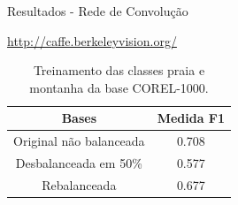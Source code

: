 \documentclass{beamer}
\begin{document}
\begin{frame}{Resultados - Rede de Convolução}
\begin{table}
\url{http://caffe.berkeleyvision.org/}
\caption{Treinamento das classes praia e montanha da base COREL-1000.}
  \begin{tabular}{c|c}
    Bases    &   Medida F1 \\ \hline
    Original não balanceada     &   0.708  \\
    Desbalanceada em 50\% &   0.577  \\
    Rebalanceada  &   0.677  \\
  \end{tabular}
\end{table}
\end{frame}
\end{document}
